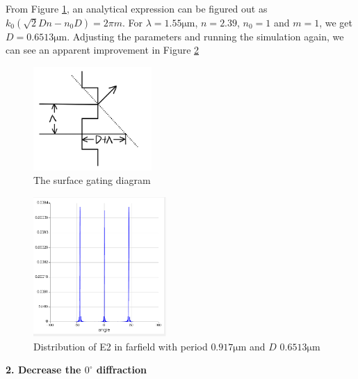 \documentclass[fontsize=11pt]{scrartcl}
\begin{document}
From Figure \ref{fig1.3}, an analytical expression can be figured out 
as $k_{0}\left(\sqrt{2} D n-n_{0} D\right)=2 \pi m$. For $\lambda=1.55\mathrm{\mu m}$, 
$n=2.39$, $n_0=1$ and $m=1$, we get $D=0.6513\mathrm{\mu m}$. 
Adjusting the parameters and running the simulation again, 
we can see an apparent improvement in Figure \ref{fig1.4}
\begin{figure}[H]
    \centering
     \includegraphics[width=0.4\textwidth]{img/fig1.3.png}
     \caption{The surface gating diagram}
     \label{fig1.3}
\end{figure}
\begin{figure}[H]
    \centering
     \includegraphics[width=0.45\textwidth]{img/fig1.4.png}
     \caption{Distribution of E2 in farfield with 
     period $0.917\mathrm{\mu m}$ and $D$ $0.6513\mathrm{\mu m}$}
     \label{fig1.4}
\end{figure}

\textbf{2. Decrease the $0^\circ$ diffraction}
\end{document}
